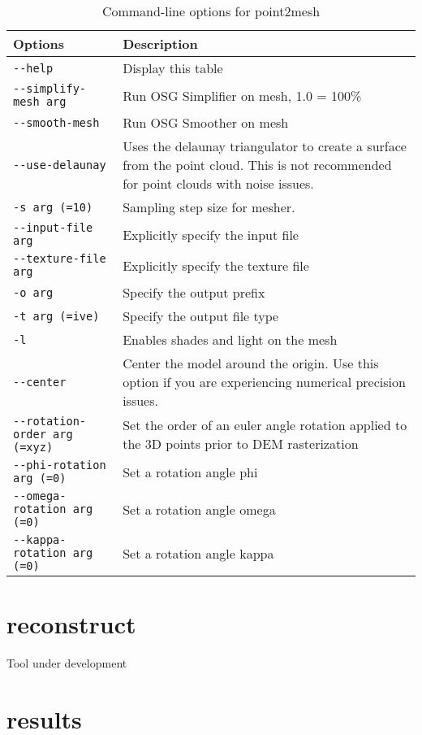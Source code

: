 \begin{longtable}{|l|p{10cm}|}
\caption{Command-line options for point2mesh}
\label{tbl:point2mesh}
\endfirsthead
\endhead
\endfoot
\endlastfoot
\hline
Options & Description \\ \hline \hline
\verb#--help# & Display this table \\ \hline
\verb#--simplify-mesh arg# & Run OSG Simplifier on mesh, 1.0 = 100\% \\ \hline
\verb#--smooth-mesh# & Run OSG Smoother on mesh \\ \hline
\verb#--use-delaunay# & Uses the delaunay triangulator to create a surface from the point cloud. This is not recommended for point clouds with noise issues. \\ \hline
\verb#-s arg (=10)# & Sampling step size for mesher. \\ \hline
\verb#--input-file arg# & Explicitly specify the input file \\ \hline
\verb#--texture-file arg# & Explicitly specify the texture file \\ \hline
\verb#-o arg# & Specify the output prefix \\ \hline
\verb#-t arg (=ive)# & Specify the output file type \\ \hline
\verb#-l# & Enables shades and light on the mesh \\ \hline
\verb#--center# & Center the model around the origin. Use this option if you are experiencing numerical precision issues. \\ \hline
\verb#--rotation-order arg (=xyz)# & Set the order of an euler angle rotation applied to the 3D points prior to DEM rasterization \\ \hline
\verb#--phi-rotation arg (=0)# & Set a rotation angle phi \\ \hline
\verb#--omega-rotation arg (=0)# & Set a rotation angle omega \\ \hline
\verb#--kappa-rotation arg (=0)# & Set a rotation angle kappa \\ \hline
\end{longtable}

\section{reconstruct}
\label{reconstruct}

Tool under development

\section{results}
\label{results}

